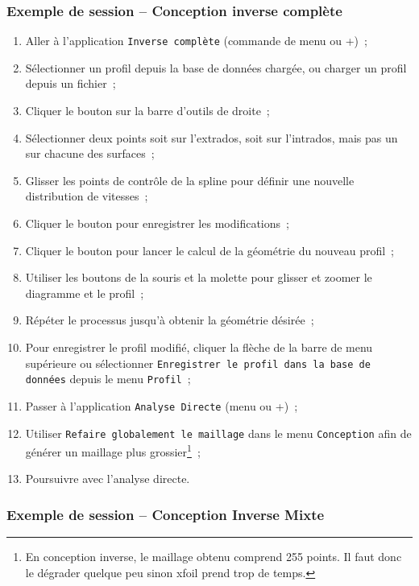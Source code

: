\documentclass[a4paper,twoside,12pt,dvips]{article}
\begin{document}
\subsubsection{Exemple de session – Conception inverse complète}
\begin{enumerate}
	\item Aller à l’application \texttt{Inverse complète} (commande de menu ou
	+)~;
	\item Sélectionner un profil depuis la base de données chargée, ou charger
	un profil depuis un fichier~;
	\item Cliquer le bouton  sur la barre d’outils de
	droite~;
	\item Sélectionner deux points soit sur l’extrados, soit sur l’intrados, 
	mais pas un sur chacune des surfaces~;
	\item Glisser les points de contrôle de la spline pour définir une nouvelle
	distribution de vitesses~;
	\item Cliquer le bouton  pour enregistrer les 
	modifications~;
    \setcounter{enumTemp}{\theenumi}
	\item Cliquer le bouton  pour lancer le calcul de la 
	géométrie du nouveau profil~;
	\item Utiliser les boutons de la souris et la molette pour glisser et
	zoomer le diagramme et le profil~;
	\item Répéter le processus jusqu’à obtenir la géométrie désirée~;
	\item Pour enregistrer le profil modifié, cliquer la flèche de la barre
	de menu supérieure ou sélectionner \texttt{Enregistrer le profil dans la
	base de données} depuis le menu \texttt{Profil}~;
	\item Passer à l’application \texttt{Analyse Directe} (menu ou 
	+)~;
	\item Utiliser \texttt{Refaire globalement le maillage} dans le menu
	 \texttt{Conception} afin de générer un maillage plus grossier\footnote{En 
	 conception inverse, le maillage obtenu comprend 255 points. Il faut donc le
	 dégrader quelque peu sinon xfoil prend trop de temps.}~;
	\item Poursuivre avec l’analyse directe.
\end{enumerate}

\subsubsection{Exemple de session – Conception Inverse Mixte}
\end{document}

